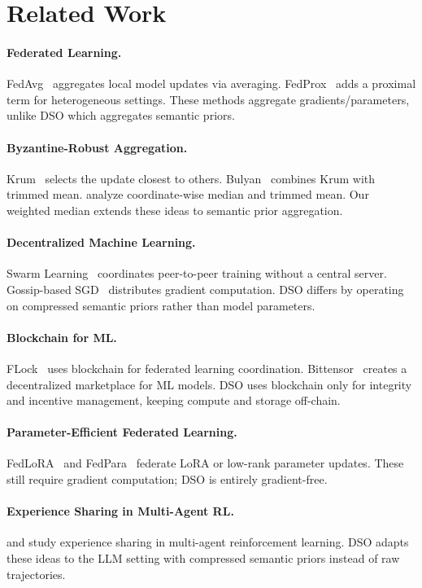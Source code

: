 \section{Related Work}

\label{sec:related}

\paragraph{Federated Learning.}
FedAvg~\cite{mcmahan2017communication} aggregates local model updates via
averaging. FedProx~\cite{li2020federated} adds a proximal term for
heterogeneous settings. These methods aggregate gradients/parameters, unlike
DSO which aggregates semantic priors.

\paragraph{Byzantine-Robust Aggregation.}
Krum~\cite{blanchard2017machine} selects the update closest to others.
Bulyan~\cite{mhamdi2018hidden} combines Krum with trimmed mean.
\cite{yin2018byzantine} analyze coordinate-wise median and trimmed mean.
Our weighted median extends these ideas to semantic prior aggregation.

\paragraph{Decentralized Machine Learning.}
Swarm Learning~\cite{warnat2021swarm} coordinates peer-to-peer training
without a central server. Gossip-based SGD~\cite{koloskova2020unified}
distributes gradient computation. DSO differs by operating on compressed
semantic priors rather than model parameters.

\paragraph{Blockchain for ML.}
FLock~\cite{flock2024} uses blockchain for federated learning coordination.
Bittensor~\cite{bittensor2023} creates a decentralized marketplace for ML
models. DSO uses blockchain only for integrity and incentive management,
keeping compute and storage off-chain.

\paragraph{Parameter-Efficient Federated Learning.}
FedLoRA~\cite{zhang2024fedlora} and FedPara~\cite{hyeon2022fedpara}
federate LoRA or low-rank parameter updates. These still require gradient
computation; DSO is entirely gradient-free.

\paragraph{Experience Sharing in Multi-Agent RL.}
\cite{christianos2021scaling} and \cite{baker2020emergent} study experience
sharing in multi-agent reinforcement learning. DSO adapts these ideas to the
LLM setting with compressed semantic priors instead of raw trajectories.

